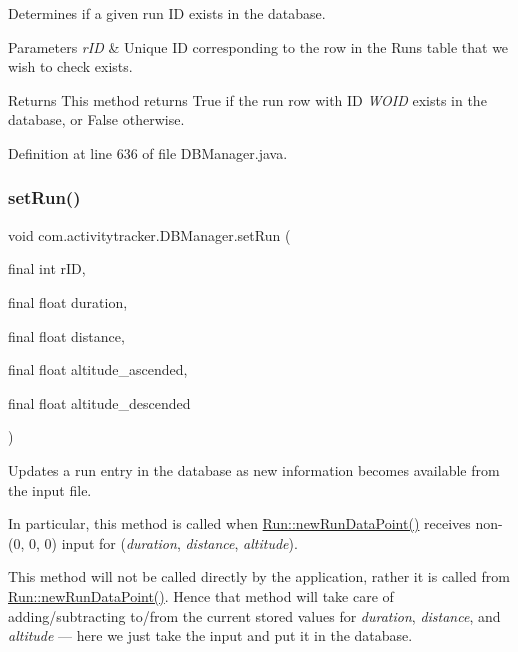 Determines if a given run ID exists in the database.


\begin{DoxyParams}{Parameters}
{\em r\+ID} & Unique ID corresponding to the row in the Runs table that we wish to check exists.\\
\hline
\end{DoxyParams}
\begin{DoxyReturn}{Returns}
This method returns True if the run row with ID {\itshape W\+O\+ID} exists in the database, or False otherwise. 
\end{DoxyReturn}


Definition at line 636 of file D\+B\+Manager.\+java.

\mbox{\label{classcom_1_1activitytracker_1_1_d_b_manager_a72282377a552ce4ce371abff02e312f2}} 
\subsubsection{\texorpdfstring{set\+Run()}{setRun()}}
{\footnotesize\ttfamily void com.\+activitytracker.\+D\+B\+Manager.\+set\+Run (\begin{DoxyParamCaption}\item[{final int}]{r\+ID,  }\item[{final float}]{duration,  }\item[{final float}]{distance,  }\item[{final float}]{altitude\+\_\+ascended,  }\item[{final float}]{altitude\+\_\+descended }\end{DoxyParamCaption})}

Updates a run entry in the database as new information becomes available from the input file.

In particular, this method is called when \mbox{\hyperlink{classcom_1_1activitytracker_1_1_run_a5dea6f1860431103d553ce770382afe0}{Run\+::new\+Run\+Data\+Point()}} receives non-\/(0, 0, 0) input for ({\itshape duration}, {\itshape distance}, {\itshape altitude}).

This method will not be called directly by the application, rather it is called from \mbox{\hyperlink{classcom_1_1activitytracker_1_1_run_a5dea6f1860431103d553ce770382afe0}{Run\+::new\+Run\+Data\+Point()}}. Hence that method will take care of adding/subtracting to/from the current stored values for {\itshape duration}, {\itshape distance}, and {\itshape altitude} --- here we just take the input and put it in the database.


